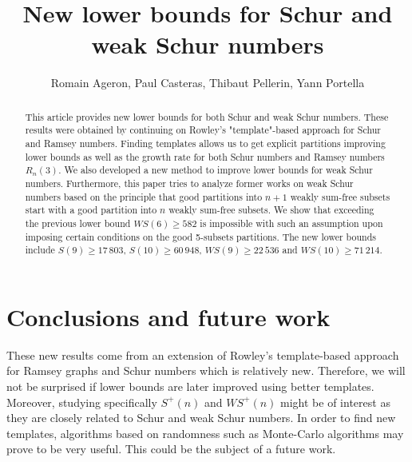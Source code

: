 \documentclass{article}
\title{New lower bounds for Schur and weak Schur numbers}
\author{Romain Ageron, Paul Casteras, Thibaut Pellerin, Yann Portella}
\newtheorem{computational theorem}{Computational Theorem}[section]
\newcommand{\WS}{\mathit{WS}}
\begin{document}
\maketitle

\begin{abstract}

This article provides new lower bounds for both Schur and weak Schur numbers. These results were obtained by 
continuing on Rowley's "template"-based approach for Schur and Ramsey numbers. Finding templates allows us to 
get explicit partitions improving lower bounds as well as the growth rate for both Schur numbers and Ramsey 
numbers \(R_n(3)\). We also developed a new method to improve lower bounds for weak Schur numbers. 
Furthermore, this paper tries to analyze former works on weak Schur numbers based on the principle that good 
partitions into \(n+1\) weakly sum-free subsets start with a good partition into \(n\) weakly sum-free subsets. 
We show that exceeding the previous lower bound \(\WS (6) \geqslant 582\) is impossible with such an assumption 
upon imposing certain conditions on the good 5-subsets partitions. The new lower bounds include 
\(S(9) \geqslant 17\,803\), \(S(10) \geqslant 60\,948\), \(\WS (9) \geqslant 22\,536\) and 
\(\WS (10) \geqslant 71\,214 \).

\end{abstract}











\section{Conclusions and future work}

\qquad These new results come from an extension of Rowley's template-based approach for Ramsey graphs and 
Schur numbers which is relatively new. Therefore, we will not be surprised if lower bounds are later improved 
using better templates. Moreover, studying specifically \(S^+(n)\) and \(\WS^+(n)\) might be of interest as they
 are closely related to Schur and weak Schur numbers. In order to find new templates, algorithms based on 
randomness such as Monte-Carlo algorithms may prove to be very useful. This could be the subject of a future work.
\end{document}
